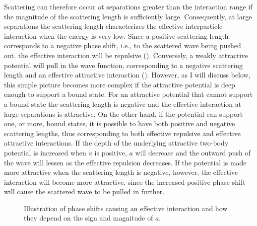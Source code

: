 Scattering can therefore occur at separations greater than the interaction range if the magnitude of the scattering length is sufficiently large. Consequently, at large separations the scattering length characterizes the effective interparticle interaction when the energy is very low. Since a positive scattering length corresponds to a negative phase shift, i.e., to the scattered wave being pushed out, the effective interaction will be repulsive (). Conversely, a weakly attractive potential will pull in the wave function, corresponding to a negative scattering length and an effective attractive interaction (). However, as I will discuss below, this simple picture becomes more complex if the attractive potential is deep enough to support a bound state. For an attractive potential that cannot support a bound state the scattering length is negative and the effective interaction at large separations is attractive. On the other hand, if the potential can support one, or more, bound states, it is possible to have both positive and negative scattering lengths, thus corresponding to both effective repulsive and effective attractive interactions. If the depth of the underlying attractive two-body potential is increased when $a$ is positive, $a$ will decrease and the outward push of the wave will lessen as the effective repulsion decreases. If the potential is made more attractive when the scattering length is negative, however, the effective interaction will become more attractive, since the increased positive phase shift will cause the scattered wave to be pulled in further. 

\begin{figure}[h!]
	\centering
	\hfill %
	\caption{Illustration of phase shifts causing an effective interaction and how they depend on the sign and magnitude of $a$.}\label{fig:phaseshift}
\end{figure}

